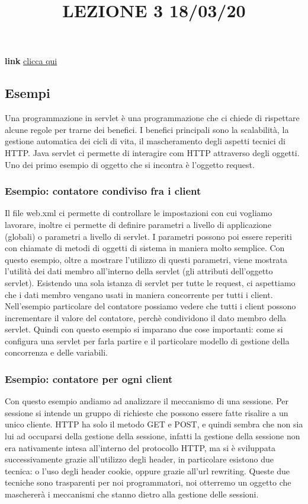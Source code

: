 \title{LEZIONE 3 18/03/20}\newline
\textbf{link} \href{https://web.microsoftstream.com/video/53d9a40e-3109-44fc-8195-0553eedfb6d9}{clicca qui}
\subsection{Esempi}
Una programmazione in servlet è una programmazione che ci chiede di rispettare alcune regole per trarne dei benefici. I benefici principali sono la scalabilità, la gestione automatica dei cicli di vita, il mascheramento degli aspetti tecnici di HTTP. Java servlet ci permette di interagire com HTTP attraverso degli oggetti. Uno dei primo esempio di oggetto che si incontra è l'oggetto request.
\subsubsection{Esempio: contatore condiviso fra i client}
Il file web.xml ci permette di controllare le impostazioni con cui vogliamo lavorare, inoltre ci permette di definire parametri a livello di applicazione (globali) o parametri a livello di servlet.\newline
I parametri possono poi essere reperiti con chiamate di metodi di oggetti di sistema in maniera molto semplice.\newline
Con questo esempio, oltre a mostrare l'utilizzo di questi parametri, viene mostrata l'utilità dei dati membro all'interno della servlet (gli attributi dell'oggetto servlet). Esistendo una sola istanza di servlet per tutte le request, ci aspettiamo che i dati membro vengano usati in maniera concorrente per tutti i client.\newline
Nell'esempio particolare del contatore possiamo vedere che tutti i client possono incrementare il valore del contatore, perchè condividono il dato membro della servlet.\newline
Quindi con questo esempio si imparano due cose importanti: come si configura una servlet per farla partire e il particolare modello di gestione della concorrenza e delle variabili.
\subsubsection{Esempio: contatore per ogni client}
Con questo esempio andiamo ad analizzare il meccanismo di una sessione. Per sessione si intende un gruppo di richieste che possono essere fatte risalire a un unico cliente. HTTP ha solo il metodo GET e POST, e quindi sembra che non sia lui ad occuparsi della gestione della sessione, infatti la gestione della sessione non era nativamente intesa all'interno del protocollo HTTP, ma si è sviluppata successivamente grazie all'utilizzo degli header, in particolare esistono due tecnica: o l'uso degli header cookie, oppure grazie all'url rewriting.\newline
Queste due tecniche sono trasparenti per noi programmatori, noi otterremo un oggetto che maschererà i meccanismi che stanno dietro alla gestione delle sessioni.
